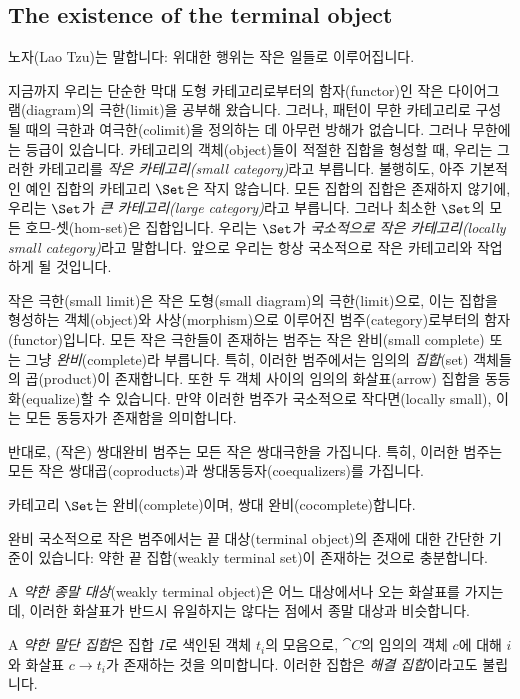 \documentclass[DaoFP]{subfiles}
\begin{document}
\subsection{The existence of the terminal object}

노자(Lao Tzu)는 말합니다: 위대한 행위는 작은 일들로 이루어집니다.

지금까지 우리는 단순한 막대 도형 카테고리로부터의 함자(functor)인 작은 다이어그램(diagram)의 극한(limit)을 공부해 왔습니다. 그러나, 패턴이 무한 카테고리로 구성될 때의 극한과 여극한(colimit)을 정의하는 데 아무런 방해가 없습니다. 그러나 무한에는 등급이 있습니다. 카테고리의 객체(object)들이 적절한 집합을 형성할 때, 우리는 그러한 카테고리를 \emph{작은 카테고리(small category)}라고 부릅니다. 불행히도, 아주 기본적인 예인 집합의 카테고리 $\Set$은 작지 않습니다. 모든 집합의 집합은 존재하지 않기에, 우리는 $\Set$가 \emph{큰 카테고리(large category)}라고 부릅니다. 그러나 최소한 $\Set$의 모든 호므-셋(hom-set)은 집합입니다. 우리는 $\Set$가 \emph{국소적으로 작은 카테고리(locally small category)}라고 말합니다. 앞으로 우리는 항상 국소적으로 작은 카테고리와 작업하게 될 것입니다.

작은 극한(small limit)은 작은 도형(small diagram)의 극한(limit)으로, 이는 집합을 형성하는 객체(object)와 사상(morphism)으로 이루어진 범주(category)로부터의 함자(functor)입니다. 모든 작은 극한들이 존재하는 범주는 작은 완비(small complete) 또는 그냥 \emph{완비}(complete)라 부릅니다. 특히, 이러한 범주에서는 임의의 \emph{집합}(set) 객체들의 곱(product)이 존재합니다. 또한 두 객체 사이의 임의의 화살표(arrow) 집합을 동등화(equalize)할 수 있습니다. 만약 이러한 범주가 국소적으로 작다면(locally small), 이는 모든 동등자가 존재함을 의미합니다.

반대로, (작은) 쌍대완비 범주는 모든 작은 쌍대극한을 가집니다. 특히, 이러한 범주는 모든 작은 쌍대곱(coproducts)과 쌍대동등자(coequalizers)를 가집니다.

카테고리 $\Set$는 완비(complete)이며, 쌍대 완비(cocomplete)합니다.


완비 국소적으로 작은 범주에서는 끝 대상(terminal object)의 존재에 대한 간단한 기준이 있습니다: 약한 끝 집합(weakly terminal set)이 존재하는 것으로 충분합니다.

A \emph{약한 종말 대상}(weakly terminal object)은 어느 대상에서나 오는 화살표를 가지는데, 이러한 화살표가 반드시 유일하지는 않다는 점에서 종말 대상과 비슷합니다.

A \emph{약한 말단 집합}은 집합 $I$로 색인된 객체 $t_i$의 모음으로, $\cat C$의 임의의 객체 $c$에 대해 $i$와 화살표 $c \to t_i$가 존재하는 것을 의미합니다. 이러한 집합은 \emph{해결 집합}이라고도 불립니다.
\end{document}
